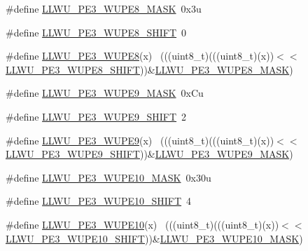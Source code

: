 \begin{DoxyCompactItemize}
\item 
\#define \hyperlink{group___l_l_w_u___register___masks_gabe7fce492e2c0201c4bb5af893f5a63d}{L\+L\+W\+U\+\_\+\+P\+E3\+\_\+\+W\+U\+P\+E8\+\_\+\+M\+A\+SK}~0x3u
\item 
\#define \hyperlink{group___l_l_w_u___register___masks_gaf02591badd7f37915120d0fd627cdf27}{L\+L\+W\+U\+\_\+\+P\+E3\+\_\+\+W\+U\+P\+E8\+\_\+\+S\+H\+I\+FT}~0
\item 
\#define \hyperlink{group___l_l_w_u___register___masks_ga61f1881833fb1eecf76dca9958fe19b2}{L\+L\+W\+U\+\_\+\+P\+E3\+\_\+\+W\+U\+P\+E8}(x)                                            ~(((uint8\+\_\+t)(((uint8\+\_\+t)(x))$<$$<$\hyperlink{group___l_l_w_u___register___masks_gaf02591badd7f37915120d0fd627cdf27}{L\+L\+W\+U\+\_\+\+P\+E3\+\_\+\+W\+U\+P\+E8\+\_\+\+S\+H\+I\+FT}))\&\hyperlink{group___l_l_w_u___register___masks_gabe7fce492e2c0201c4bb5af893f5a63d}{L\+L\+W\+U\+\_\+\+P\+E3\+\_\+\+W\+U\+P\+E8\+\_\+\+M\+A\+SK})
\item 
\#define \hyperlink{group___l_l_w_u___register___masks_gad03733955d18194da002aeceedc2edf5}{L\+L\+W\+U\+\_\+\+P\+E3\+\_\+\+W\+U\+P\+E9\+\_\+\+M\+A\+SK}~0x\+Cu
\item 
\#define \hyperlink{group___l_l_w_u___register___masks_ga26cad28b7fe4fd2da53ece9d3744016c}{L\+L\+W\+U\+\_\+\+P\+E3\+\_\+\+W\+U\+P\+E9\+\_\+\+S\+H\+I\+FT}~2
\item 
\#define \hyperlink{group___l_l_w_u___register___masks_gac73074d8d4040f05f97c8738c2617350}{L\+L\+W\+U\+\_\+\+P\+E3\+\_\+\+W\+U\+P\+E9}(x)                                            ~(((uint8\+\_\+t)(((uint8\+\_\+t)(x))$<$$<$\hyperlink{group___l_l_w_u___register___masks_ga26cad28b7fe4fd2da53ece9d3744016c}{L\+L\+W\+U\+\_\+\+P\+E3\+\_\+\+W\+U\+P\+E9\+\_\+\+S\+H\+I\+FT}))\&\hyperlink{group___l_l_w_u___register___masks_gad03733955d18194da002aeceedc2edf5}{L\+L\+W\+U\+\_\+\+P\+E3\+\_\+\+W\+U\+P\+E9\+\_\+\+M\+A\+SK})
\item 
\#define \hyperlink{group___l_l_w_u___register___masks_ga6d8e812233df26a72459712117996efa}{L\+L\+W\+U\+\_\+\+P\+E3\+\_\+\+W\+U\+P\+E10\+\_\+\+M\+A\+SK}~0x30u
\item 
\#define \hyperlink{group___l_l_w_u___register___masks_ga1686c8515045158eeef3fc0c5df480d9}{L\+L\+W\+U\+\_\+\+P\+E3\+\_\+\+W\+U\+P\+E10\+\_\+\+S\+H\+I\+FT}~4
\item 
\#define \hyperlink{group___l_l_w_u___register___masks_ga08307363da95dd3aef24ec6c32a04f81}{L\+L\+W\+U\+\_\+\+P\+E3\+\_\+\+W\+U\+P\+E10}(x)                                          ~(((uint8\+\_\+t)(((uint8\+\_\+t)(x))$<$$<$\hyperlink{group___l_l_w_u___register___masks_ga1686c8515045158eeef3fc0c5df480d9}{L\+L\+W\+U\+\_\+\+P\+E3\+\_\+\+W\+U\+P\+E10\+\_\+\+S\+H\+I\+FT}))\&\hyperlink{group___l_l_w_u___register___masks_ga6d8e812233df26a72459712117996efa}{L\+L\+W\+U\+\_\+\+P\+E3\+\_\+\+W\+U\+P\+E10\+\_\+\+M\+A\+SK})
$$
\end{DoxyCompactItemize}
